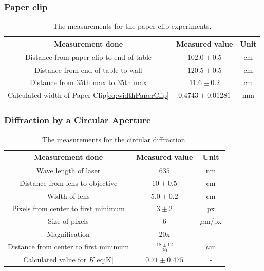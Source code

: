 \documentclass{emulateapj}
\begin{document}
\subsubsection{Paper clip}

\begin{table}[H]
\begin{tabular}{ c c c }
Measurement done & Measured value & Unit\\
\hline
Distance from paper clip to end of table & $102.0 \pm 0.5$ & cm \\
Distance from end of table to wall & $120.5 \pm 0.5$ & cm \\
Distance from 35th max to 35th max & $11.6 \pm 0.2$ & cm\\
Calculated width of Paper Clip\eqref{eq:widthPaperClip} & $0.4743 \pm 0.01281$ & mm
\end{tabular}
\caption{The measurements for the paper clip experiments.}
\end{table}\label{tab:dataPaperClip}

\subsubsection{Diffraction by a Circular Aperture}

\begin{table}[H]
\begin{tabular}{ c c c }
Measurement done & Measured value & Unit\\
\hline
Wave length of laser & $635$ & nm \\
Distance from lens to objective & $10 \pm 0.5$ & cm\\
Width of lens & $5.0 \pm 0.2$ & cm\\
Pixels from center to first minimum & $3 \pm 2$ & px\\
Size of pixels & $6$ & $\mu$m/px\\
Magnification & 20x & -\\
Distance from center to first minimum & $\frac{18 \pm 12}{20}$& $\mu$m\\
Calculated value for $K$\eqref{eq:K} &  $0.71 \pm 0.475$ & -
\end{tabular}
\caption{The measurements for the circular diffraction.}
\end{table}\label{tab:dataAiry}
\end{document}
